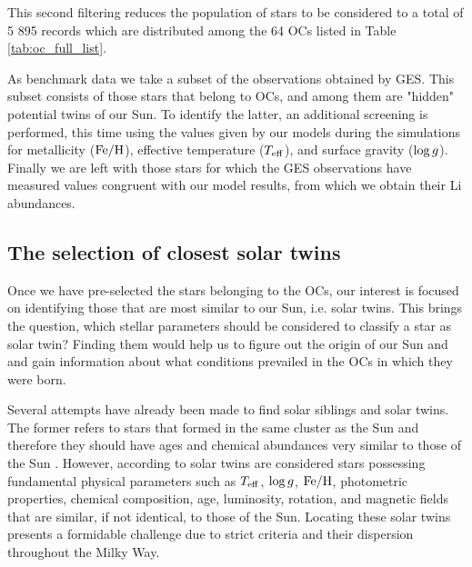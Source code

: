\documentclass[fleqn,usenatbib]{mnras}
\begin{document}
This second filtering reduces the population of stars to be considered to a total of 5 895 records which are distributed among the 64 OCs listed in Table \ref{tab:oc_full_list}.\par

As benchmark data we take a subset of the observations obtained by GES. This subset consists of those stars that belong to OCs, and among them are "hidden" potential twins of our Sun. To identify the latter, an additional screening is performed, this time using the values given by our models during the simulations for metallicity ($\mathrm{Fe}/\mathrm{H}$), effective temperature ($T_{\mathrm{eff}}$), and surface gravity ($\mathrm{log} \, g$). Finally we are left with those stars for which the GES observations have measured values congruent with our model results, from which we obtain their Li abundances.\par


\subsection{The selection of closest solar twins}
Once we have pre-selected the stars belonging to the OCs, our interest is focused on identifying those that are most similar to our Sun, i.e. solar twins. This brings the question, which stellar parameters should be considered to classify a star as solar twin? Finding them would help us to figure out the origin of our Sun and and gain information about what conditions prevailed in the OCs in which they were born.\par

Several attempts have already been made to find solar siblings and solar twins. The former refers to stars that formed in the same cluster as the Sun and therefore they should have ages and chemical abundances very similar to those of the Sun \citep[see][and references therein]{Adibekyan2018}. However, according to \citet{Strobel1996} solar twins are considered stars possessing fundamental physical parameters such as $T_{\mathrm{eff}}$, $\mathrm{log} \, g$, $\mathrm{Fe}/\mathrm{H}$, photometric properties, chemical composition, age, luminosity, rotation, and magnetic fields that are similar, if not identical, to those of the Sun. Locating these solar twins presents a formidable challenge due to strict criteria and their dispersion throughout the Milky Way.\par 
\end{document}
